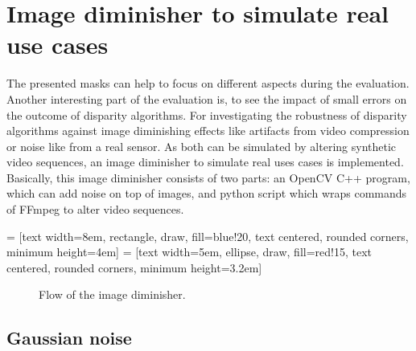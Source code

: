 \newpage

\section{Image diminisher to simulate real use cases}

The presented masks can help to focus on different aspects during the evaluation.
Another interesting part of the evaluation is, to see the impact of small errors on the outcome of disparity algorithms.
For investigating the robustness of disparity algorithms against image diminishing effects like artifacts from video compression or noise like from a real sensor.
As both can be simulated by altering synthetic video sequences, an image diminisher to simulate real uses cases is implemented.
Basically, this image diminisher consists of two parts: an OpenCV C++ program, which can add noise on top of images, and python script which wraps commands of FFmpeg to alter video sequences.

 = [text width=8em, rectangle, draw, fill=blue!20, text centered, rounded corners, minimum height=4em]
 = [text width=5em, ellipse, draw, fill=red!15, text centered, rounded corners, minimum height=3.2em]
\begin{figure}[h!]
  \vspace{1cm}
  \centering
  \caption{Flow of the image diminisher.}
  \label{fig:image-diminisher-flow}
\end{figure}

\subsection*{Gaussian noise}

